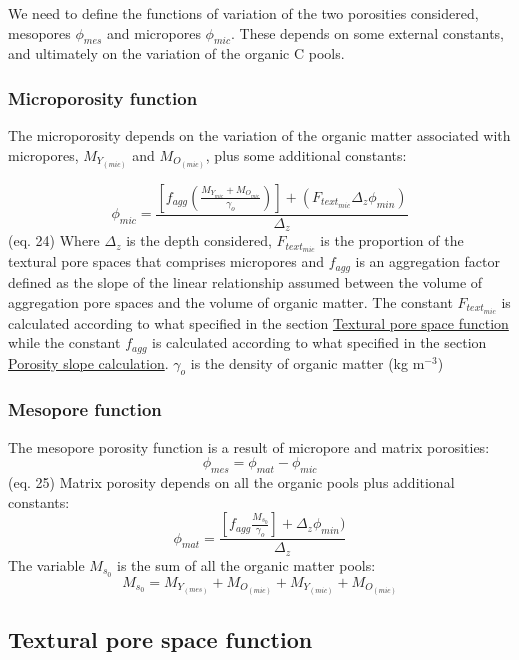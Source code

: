 \documentclass[]{tufte-handout}
\begin{document}
We need to define the functions of variation of the two porosities
considered, mesopores \(\phi_{mes}\) and micropores \(\phi_{mic}\).
These depends on some external constants, and ultimately on the
variation of the organic C pools.

\hypertarget{microporosity-function}{%
\subsubsection{Microporosity function}\label{microporosity-function}}

The microporosity depends on the variation of the organic matter
associated with micropores, \(M_{Y_{(mic)}}\) and \(M_{O_{(mic)}}\),
plus some additional constants:

\[ \phi_{mic} = \frac{\left[ f_{agg} \left(  \frac{M_{Y_{mic}}+ M_{O_{mic}}}{ \gamma_o} \right)\right] + (F_{text_{mic}} \Delta_z \phi_{min})}{\Delta_z}\]
(eq. 24) Where \(\Delta_z\) is the depth considered, \(F_{text_{mic}}\)
is the proportion of the textural pore spaces that comprises micropores
and \(f_{agg}\) is an aggregation factor defined as the slope of the
linear relationship assumed between the volume of aggregation pore
spaces and the volume of organic matter. The constant \(F_{text_{mic}}\)
is calculated according to what specified in the section
\protect\hyperlink{textural-pore-space-function}{Textural pore space
function} while the constant \(f_{agg}\) is calculated according to what
specified in the section
\protect\hyperlink{porosity-slope-calculation}{Porosity slope
calculation}. \(\gamma_o\) is the density of organic matter (kg
m\(^{-3}\))

\hypertarget{mesopore-function}{%
\subsubsection{Mesopore function}\label{mesopore-function}}

The mesopore porosity function is a result of micropore and matrix
porosities: \[ \phi_{mes} = \phi_{mat}-\phi_{mic} \] (eq. 25) Matrix
porosity depends on all the organic pools plus additional constants:
\[\phi_{mat} = \frac{\left[ f_{agg} \frac{M_{s_{0}}}{ \gamma_o} \right] + \Delta_z \phi_{min})}{\Delta_z}\]
The variable \(M_{s_{0}}\) is the sum of all the organic matter pools:
\[M_{s_{0}} = M_{Y_{(mes)}} + M_{O_{(mic)}} + M_{Y_{(mic)}} + M_{O_{(mic)}}\]

\hypertarget{textural-pore-space-function}{%
\subsection{Textural pore space
function}\label{textural-pore-space-function}}
\end{document}
